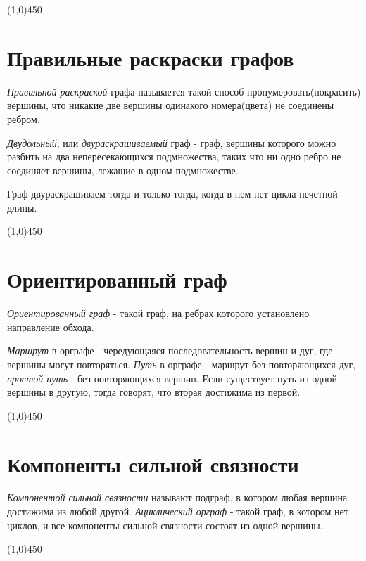 \documentclass[a4paper,12pt]{article}
\begin{document}
	\begin{center}
		\line(1,0){450}
	\end{center}

	\section*{Правильные раскраски графов}
	\textit{Правильной раскраской} графа называется такой способ пронумеровать(покрасить) вершины, что никакие две вершины одинакого номера(цвета) не соединены ребром.

	\textit{Двудольный}, или \textit{двураскрашиваемый} граф - граф, вершины которого можно разбить на два непересекающихся подмножества, таких что ни одно ребро не соединяет вершины, лежащие в одном подмножестве.

	Граф двураскрашиваем тогда и только тогда, когда в нем нет цикла нечетной длины.

	\begin{center}
		\line(1,0){450}
	\end{center}

	\section*{Ориентированный граф}
	\textit{Ориентированный граф} - такой граф, на ребрах которого установлено направление обхода.

	\textit{Маршрут} в орграфе - чередующаяся последовательность вершин и дуг, где вершины могут повторяться.
	\textit{Путь} в орграфе - маршрут без повторяющихся дуг, \textit{простой путь} - без повторяющихся вершин. Если существует путь из одной вершины в другую, тогда говорят, что вторая достижима из первой.

	\begin{center}
		\line(1,0){450}
	\end{center}

	\section*{Компоненты сильной связности}
	\textit{Компонентой сильной связности} называют подграф, в котором любая вершина достижима из любой другой.
	\textit{Ациклический орграф} - такой граф, в котором нет циклов, и все компоненты сильной связности состоят из одной вершины.

	\begin{center}
		\line(1,0){450}
	\end{center}
\end{document}
